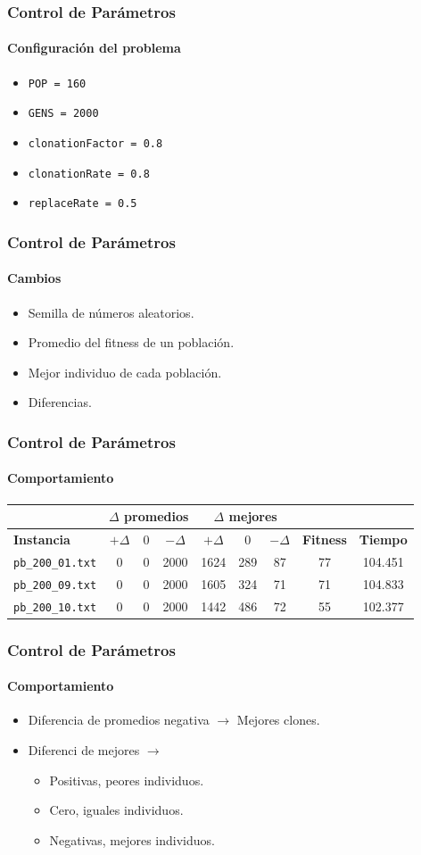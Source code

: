 \frame
{
\frametitle{Control de Parámetros}
\framesubtitle{Configuración del problema}
\begin{itemize}
    \item \texttt{POP = 160}
    \item \texttt{GENS = 2000}
    \item \texttt{clonationFactor = 0.8}
    \item \texttt{clonationRate = 0.8}
    \item \texttt{replaceRate = 0.5}
\end{itemize}

}

\frame
{
\frametitle{Control de Parámetros}
\framesubtitle{Cambios}
\begin{itemize}
	\item Semilla de números aleatorios.
	\item Promedio del fitness de un población.
	\item Mejor individuo de cada población.
	\item Diferencias.
\end{itemize}
}
\frame
{
\frametitle{Control de Parámetros}
\framesubtitle{Comportamiento}
\begin{center}
\small{
\begin{tabular}{|l|c|c|c|c|c|c|c|c|}
\hline
  & \multicolumn{3}{|c|}{\textbf{$\Delta$ promedios}} & \multicolumn{3}{|c|}{\textbf{$\Delta$ mejores}} & & \\\hline
\textbf{Instancia} & $+\Delta$ & $0$ & $-\Delta$ & $+\Delta$ & $0$ & $-\Delta$ & \textbf{Fitness} & \textbf{Tiempo} \\\hline
\texttt{pb\_200\_01.txt} & 0 & 0 & 2000 & 1624 & 289 & 87 & 77 & 104.451 \\\hline
\texttt{pb\_200\_09.txt} & 0 & 0 & 2000 & 1605 & 324 & 71 & 71 & 104.833 \\\hline
\texttt{pb\_200\_10.txt} & 0 & 0 & 2000 & 1442 & 486 & 72 & 55 & 102.377 \\\hline
\end{tabular}
}
\end{center}
}
\frame
{
\frametitle{Control de Parámetros}
\framesubtitle{Comportamiento}
\begin{itemize}
	\item Diferencia de promedios negativa $\rightarrow$ Mejores clones.
	\item Diferenci de mejores $\rightarrow$
	\begin{itemize}
		\item Positivas, peores individuos.
		\item Cero, iguales individuos.
		\item Negativas, mejores individuos.
	\end{itemize}
\end{itemize}
}

